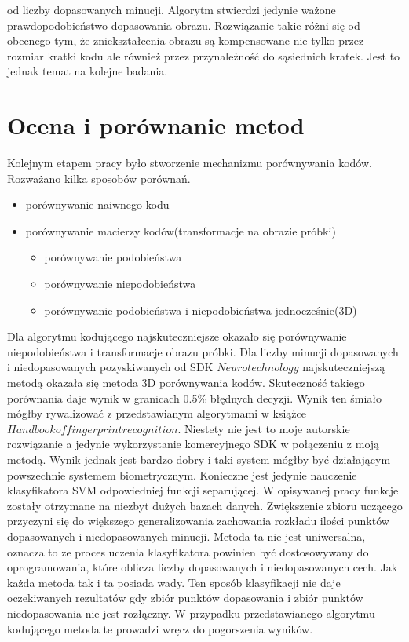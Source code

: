 od liczby dopasowanych minucji. Algorytm stwierdzi jedynie ważone prawdopodobieństwo dopasowania obrazu. Rozwiązanie takie różni się od obecnego tym, że zniekształcenia obrazu są kompensowane nie tylko przez rozmiar kratki kodu ale również przez przynależność do sąsiednich kratek. Jest to jednak temat na kolejne badania.
\section [Ocena i porównanie metod][Ocena i porównanie metod]{Ocena i porównanie metod}
Kolejnym etapem pracy było stworzenie mechanizmu porównywania kodów. Rozważano kilka sposobów porównań.
\renewcommand*{\labelitemi}{\bullet}
\begin{itemize}
	\item porównywanie naiwnego kodu
	\item porównywanie macierzy kodów(transformacje na obrazie próbki)
	\begin{itemize}
		\item porównywanie podobieństwa
		\item porównywanie niepodobieństwa
		\item porównywanie podobieństwa i niepodobieństwa jednocześnie(3D)
	\end{itemize}
\end{itemize}
Dla algorytmu kodującego najskuteczniejsze okazało się porównywanie niepodobieństwa i transformacje obrazu próbki. Dla liczby minucji dopasowanych i niedopasowanych pozyskiwanych od SDK $Neurotechnology$ najskuteczniejszą metodą okazała się metoda 3D porównywania kodów. Skuteczność takiego porównania daje wynik w granicach 0.5\% błędnych decyzji. Wynik ten śmiało mógłby rywalizować z przedstawianym algorytmami w książce $Handbook of fingerprint recognition$\cite{finger_book}. Niestety nie jest to moje autorskie rozwiązanie a jedynie wykorzystanie komercyjnego SDK w połączeniu z moją metodą. Wynik jednak jest bardzo dobry i taki system mógłby być działającym powszechnie systemem biometrycznym. Konieczne jest jedynie nauczenie klasyfikatora SVM odpowiedniej funkcji separującej. W opisywanej pracy funkcje zostały otrzymane na niezbyt dużych bazach danych. Zwiększenie zbioru uczącego przyczyni się do większego generalizowania zachowania rozkładu ilości punktów dopasowanych i niedopasowanych minucji. Metoda ta nie jest uniwersalna, oznacza to ze proces uczenia klasyfikatora powinien być dostosowywany do oprogramowania, które oblicza liczby dopasowanych i niedopasowanych cech. Jak każda metoda tak i ta posiada wady. Ten sposób klasyfikacji nie daje oczekiwanych rezultatów gdy zbiór punktów dopasowania i zbiór punktów niedopasowania nie jest rozłączny. W przypadku przedstawianego algorytmu kodującego metoda te prowadzi wręcz do pogorszenia wyników. 

